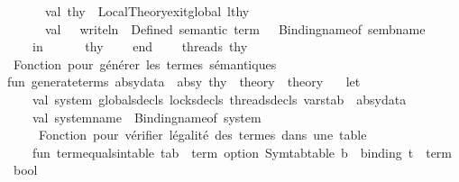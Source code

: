 \begin{isabellebody}
\ \ \ \ \ \ val\ thy{\isacharprime}{\kern0pt}{\isacharprime}{\kern0pt}{\isacharprime}{\kern0pt}\ {\isacharequal}{\kern0pt}\ Local{\isacharunderscore}{\kern0pt}Theory{\isachardot}{\kern0pt}exit{\isacharunderscore}{\kern0pt}global\ lthy{}{\isacharprime}{\kern0pt}\isanewline
\ \ \ \ \ \ \isanewline
\ \ \ \ \ \ val\ {\isacharunderscore}{\kern0pt}\ {\isacharequal}{\kern0pt}\ writeln\ {\isacharparenleft}{\kern0pt}{\isachardoublequote}{\kern0pt}{\isasymcheckmark}\ Defined\ semantic\ term{\isacharcolon}{\kern0pt}\ {\isachardoublequote}{\kern0pt}\ {\isacharcircum}{\kern0pt}\ Binding{\isachardot}{\kern0pt}name{\isacharunderscore}{\kern0pt}of\ sem{\isacharunderscore}{\kern0pt}bname{\isacharparenright}{\kern0pt}\isanewline
\isanewline
\ \ \ \ in\isanewline
\ \ \ \ \ \ thy{\isacharprime}{\kern0pt}{\isacharprime}{\kern0pt}{\isacharprime}{\kern0pt}\isanewline
\ \ \ \ end{\isacharparenright}{\kern0pt}\isanewline
\ \ \ \ threads\ thy\isanewline
{\isacartoucheclose}\isanewline
\isanewline
{}\isamarkupfalse%
{\isacartoucheopen}\isanewline
{\isacharparenleft}{\kern0pt}{\isacharasterisk}{\kern0pt}\ Fonction\ pour\ générer\ les\ termes\ sémantiques\ {\isacharasterisk}{\kern0pt}{\isacharparenright}{\kern0pt}\isanewline
fun\ generate{\isacharunderscore}{\kern0pt}terms\ {\isacharparenleft}{\kern0pt}absy{\isacharunderscore}{\kern0pt}data\ {\isacharcolon}{\kern0pt}\ absy{\isacharparenright}{\kern0pt}\ {\isacharparenleft}{\kern0pt}thy\ {\isacharcolon}{\kern0pt}\ theory{\isacharparenright}{\kern0pt}\ {\isacharcolon}{\kern0pt}\ theory\ {\isacharequal}{\kern0pt}\isanewline
\ \ let\ \isanewline
\ \ \ \ val\ {\isacharbraceleft}{\kern0pt}system{\isacharcomma}{\kern0pt}\ globals{\isacharunderscore}{\kern0pt}decls{\isacharcomma}{\kern0pt}\ locks{\isacharunderscore}{\kern0pt}decls{\isacharcomma}{\kern0pt}\ threads{\isacharunderscore}{\kern0pt}decls{\isacharcomma}{\kern0pt}\ varstab{\isacharbraceright}{\kern0pt}\ {\isacharequal}{\kern0pt}\ absy{\isacharunderscore}{\kern0pt}data\isanewline
\ \ \ \ val\ system{\isacharunderscore}{\kern0pt}name\ {\isacharequal}{\kern0pt}\ Binding{\isachardot}{\kern0pt}name{\isacharunderscore}{\kern0pt}of\ system\isanewline
\isanewline
\ \ \ \ {\isacharparenleft}{\kern0pt}{\isacharasterisk}{\kern0pt}\ Fonction\ pour\ vérifier\ l{\isacharprime}{\kern0pt}égalité\ des\ termes\ dans\ une\ table\ {\isacharasterisk}{\kern0pt}{\isacharparenright}{\kern0pt}\isanewline
\ \ \ \ fun\ term{\isacharunderscore}{\kern0pt}equals{\isacharunderscore}{\kern0pt}in{\isacharunderscore}{\kern0pt}table\ {\isacharparenleft}{\kern0pt}tab\ {\isacharcolon}{\kern0pt}\ {\isacharparenleft}{\kern0pt}term\ option{\isacharparenright}{\kern0pt}\ Symtab{\isachardot}{\kern0pt}table{\isacharparenright}{\kern0pt}\ {\isacharparenleft}{\kern0pt}b\ {\isacharcolon}{\kern0pt}\ binding{\isacharparenright}{\kern0pt}\ {\isacharparenleft}{\kern0pt}t\ {\isacharcolon}{\kern0pt}\ term{\isacharparenright}{\kern0pt}\ {\isacharcolon}{\kern0pt}\ bool\ {\isacharequal}{\kern0pt}\isanewline

\end{isabellebody}
